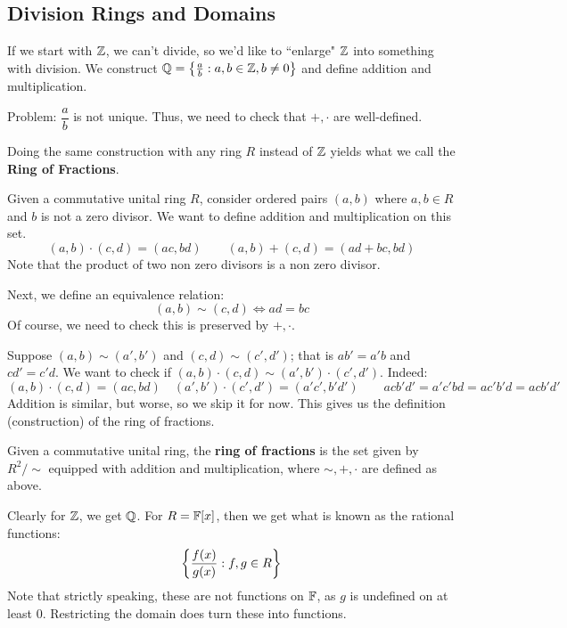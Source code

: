 \subsection{Division Rings and Domains}

If we start with $ \mathbb{Z} $, we can't divide, so we'd like to ``enlarge" $ \mathbb{Z} $ into something
with division. We construct $ \mathbb{Q} = \left\{{\frac{a}{b} : a,b \in \mathbb{Z}, b \neq 0}\right\} $ and define
addition and multiplication.

Problem: $ \dfrac{a}{b} $ is not unique. Thus, we need to check that $ +, \cdot $ are well-defined.

Doing the same construction with any ring $ R $ instead of $ \mathbb{Z} $ yields what we call the
\textbf{Ring of Fractions}.

Given a commutative unital ring $ R $, consider ordered pairs $ (a, b) $ where $ a, b \in R $ and
$ b $ is not a zero divisor. We want to define addition and multiplication on this set.
\begin{equation*}
    (a,b)\cdot(c,d) = (ac,bd) \qquad (a,b)+(c,d) = (ad+bc, bd)
\end{equation*}
Note that the product of two non zero divisors is a non zero divisor.

Next, we define an equivalence relation:
\begin{equation*}
    (a,b)\sim(c,d) \iff ad = bc
\end{equation*}
Of course, we need to check this is preserved by $ +, \cdot $.

Suppose $ (a,b) \sim (a',b') $ and $ (c,d) \sim (c',d') $; that is $ ab' = a'b $ and $ cd' = c'd $.
We want to check if $ (a,b)\cdot(c,d) \sim (a',b')\cdot(c',d') $. Indeed:
\begin{equation*}
    (a,b)\cdot(c,d) = (ac,bd) \quad (a',b')\cdot(c',d') = (a'c',b'd') \qquad
    acb'd' = a'c'bd = ac'b'd = acb'd'
\end{equation*}
Addition is similar, but worse, so we skip it for now.
This gives us the definition (construction) of the ring of fractions.

\begin{defn}
    Given a commutative unital ring, the \textbf{ring of fractions} is the set given by
    $ R^{2}/\sim $ equipped with addition and multiplication, where $ \sim, +, \cdot $ are defined
    as above.
\end{defn}
Clearly for $ \mathbb{Z} $, we get $ \mathbb{Q} $. For $ R = \mathbb{F}[x] $, then we get what is known as the
rational functions:
\begin{equation*}
    \left\{{\frac{f(x)}{g(x)} : f,g \in R}\right\}
\end{equation*}
Note that strictly speaking, these are not functions on $ \mathbb{F} $, as $ g $ is undefined on at
least 0. Restricting the domain does turn these into functions.

